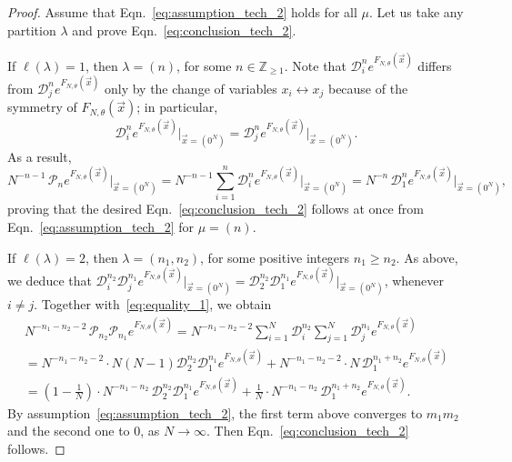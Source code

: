 \documentclass[10pt,a4paper]{amsart}
\newcommand{\D}{\mathcal D}
\renewcommand{\P}{\mathcal P}
\newcommand{\Z}{\mathbb Z}
\newcommand{\la}{\lambda}
\newcommand{\vecx}{\vec{x}}
\begin{document}
\begin{proof}
Assume that Eqn.~\eqref{eq:assumption_tech_2} holds for all $\mu$. Let us take any partition $\la$ and prove Eqn.~\eqref{eq:conclusion_tech_2}.

If $\ell(\la)=1$, then $\la=(n)$, for some $n\in\Z_{\ge 1}$.
Note that $\D_i^n e^{F_{N,\theta}(\vecx)}$ differs from $\D_j^n e^{F_{N,\theta}(\vecx)}$ only by the change of variables $x_i\leftrightarrow x_j$ because of the symmetry of $F_{N,\theta}(\vecx)$; in particular,
\begin{equation}\label{eq:equality_1}
\D_i^n e^{F_{N,\theta}(\vecx)}\big|_{\vecx=(0^N)} = \D_j^n e^{F_{N,\theta}(\vecx)}\big|_{\vecx=(0^N)}.
\end{equation}
As a result,
\begin{equation*}
N^{-n-1}\,\P_n e^{F_{N,\theta}(\vecx)} \Big|_{\vecx=(0^N)} = N^{-n-1}\sum_{i=1}^n{\D_i^n} e^{F_{N,\theta}(\vecx)} \Big|_{\vecx=(0^N)} = N^{-n}\,\D_1^n e^{F_{N,\theta}(\vecx)}\Big|_{\vecx=(0^N)},
\end{equation*}
proving that the desired Eqn.~\eqref{eq:conclusion_tech_2} follows at once from Eqn.~\eqref{eq:assumption_tech_2} for $\mu=(n)$.

\smallskip

If $\ell(\la)=2$, then $\la=(n_1,n_2)$, for some positive integers $n_1\ge n_2$. As above, we deduce that $\D_i^{n_2}\D_j^{n_1} e^{F_{N,\theta}(\vecx)}\big|_{\vecx=(0^N)} = \D_2^{n_2}\D_1^{n_1} e^{F_{N,\theta}(\vecx)}\big|_{\vecx=(0^N)}$, whenever $i\ne j$.
Together with~\eqref{eq:equality_1}, we obtain
\begin{multline*}
N^{-n_1-n_2-2}\,\P_{n_2}\P_{n_1} e^{F_{N,\theta}(\vecx)} = N^{-n_1-n_2-2}\sum_{i=1}^N{\D_i^{n_2}}\sum_{j=1}^N{\D_j^{n_1}} e^{F_{N,\theta}(\vecx)}\\
= N^{-n_1-n_2-2}\cdot N(N-1)\D_2^{n_2}\D_1^{n_1} e^{F_{N,\theta}(\vecx)} + N^{-n_1-n_2-2}\cdot N\,\D_1^{n_1+n_2} e^{F_{N,\theta}(\vecx)}\\
= \left(1-\frac{1}{N}\right)\cdot N^{-n_1-n_2}\,\D_2^{n_2}\D_1^{n_1}e^{F_{N,\theta}(\vecx)} + \frac{1}{N}\cdot N^{-n_1-n_2}\,\D_1^{n_1+n_2}e^{F_{N,\theta}(\vecx)}.
\end{multline*}
By assumption~\eqref{eq:assumption_tech_2}, the first term above converges to $m_1m_2$ and the second one to $0$, as $N\to\infty$.
Then Eqn.~\eqref{eq:conclusion_tech_2} follows.

\smallskip


\end{proof}
\end{document}
